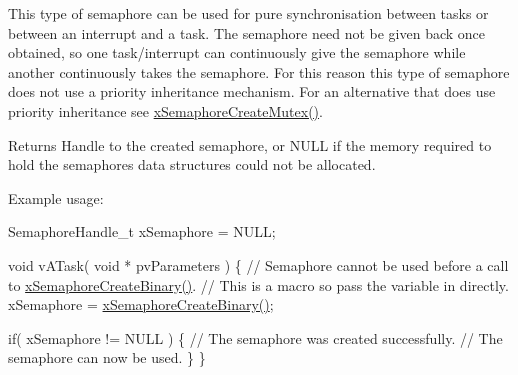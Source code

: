 This type of semaphore can be used for pure synchronisation between tasks or between an interrupt and a task. The semaphore need not be given back once obtained, so one task/interrupt can continuously \textquotesingle{}give\textquotesingle{} the semaphore while another continuously \textquotesingle{}takes\textquotesingle{} the semaphore. For this reason this type of semaphore does not use a priority inheritance mechanism. For an alternative that does use priority inheritance see \hyperlink{vendor_2ceedling_2plugins_2freertos_2src_2freertos_2include_2semphr_8h_aa6a00aa9b91a9e5b3ebe4ae1c3f115c6}{x\+Semaphore\+Create\+Mutex()}.

\begin{DoxyReturn}{Returns}
Handle to the created semaphore, or N\+U\+LL if the memory required to hold the semaphore\textquotesingle{}s data structures could not be allocated.
\end{DoxyReturn}
Example usage\+: 
\begin{DoxyPre}
SemaphoreHandle\_t xSemaphore = NULL;\end{DoxyPre}



\begin{DoxyPre}void vATask( void * pvParameters )
\{
 // Semaphore cannot be used before a call to \hyperlink{vendor_2ceedling_2plugins_2freertos_2src_2freertos_2include_2semphr_8h_acba963695e4f159d9bfa2394cae5badc}{xSemaphoreCreateBinary()}.
 // This is a macro so pass the variable in directly.
 xSemaphore = \hyperlink{vendor_2ceedling_2plugins_2freertos_2src_2freertos_2include_2semphr_8h_acba963695e4f159d9bfa2394cae5badc}{xSemaphoreCreateBinary()};\end{DoxyPre}



\begin{DoxyPre} if( xSemaphore != NULL )
 \{
     // The semaphore was created successfully.
     // The semaphore can now be used.
 \}
\}
\end{DoxyPre}
 